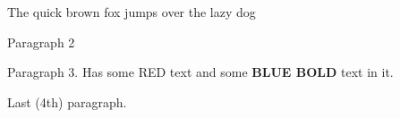 \documentclass[11pt,a4paper]{article}
\begin{document}
The quick brown fox jumps over the lazy dog

Paragraph 2

Paragraph 3. Has some RED text and some \textbf{BLUE BOLD} text in it.

Last (4th) paragraph.
\end{document}
